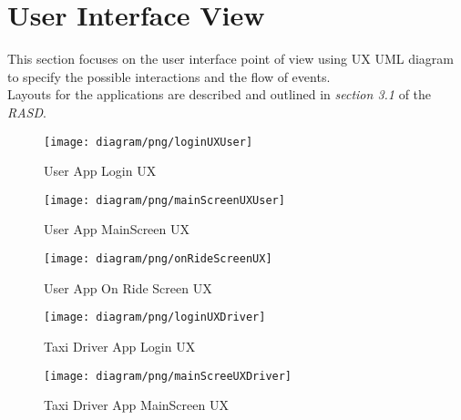 \section{User Interface View} %
\label{sec:user_interface_view}
This section focuses on the user interface point of view using UX UML diagram to specify the possible interactions and the flow of events.\\
Layouts for the applications are described and outlined in \emph{section 3.1} of the \emph{RASD}.\\

\vfill
\begin{figure}[h!t]
\caption{User App Login UX}
\texttt{[image: diagram/png/loginUXUser]}
\centering
\end{figure}
\vfill
\clearpage

\newpage
\vfill
\begin{figure}[h!t]
\caption{User App MainScreen UX}
\texttt{[image: diagram/png/mainScreenUXUser]}
\centering
\end{figure}
\vfill
\clearpage

\newpage
\vfill
\begin{figure}[h!t]
\caption{User App On Ride Screen UX}
\texttt{[image: diagram/png/onRideScreenUX]}
\centering
\end{figure}
\vfill
\clearpage

\newpage
\vfill
\begin{figure}[h!t]
\caption{Taxi Driver App Login UX}
\texttt{[image: diagram/png/loginUXDriver]}
\centering
\end{figure}
\vfill
\clearpage


\newpage
\vfill
\begin{figure}[h!t]
\caption{Taxi Driver App MainScreen UX}
\texttt{[image: diagram/png/mainScreeUXDriver]}
\centering
\end{figure}
\vfill
\clearpage